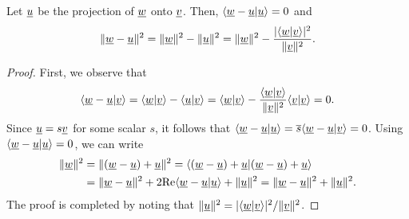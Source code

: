 \begin{lemma} \label{lem:proj_loss}
Let $\underline{u}$ be the projection of $\underline{w}$ onto $\underline{v}$.
Then, $\langle \underline{w}-\underline{u} | \underline{u} \rangle = 0$ and
\[ \|\underline{w}-\underline{u}\|^2 =  \|\underline{w}\|^2 - \| \underline{u} \|^2 = \|\underline{w}\|^2 - \frac{|\langle \underline{w} | \underline{v} \rangle|^2}{\|\underline{v}\|^2}. \]
\end{lemma}
\begin{proof}
First, we observe that
\[ \langle \underline{w} - \underline{u} | \underline{v} \rangle = \langle \underline{w} | \underline{v} \rangle - \langle \underline{u} | \underline{v} \rangle = \langle \underline{w} | \underline{v} \rangle - \frac{\left\langle \underline{w} | \underline{v} \right\rangle}{\|\underline{v}\|^2} \langle \underline{v} | \underline{v} \rangle = 0. \]
Since $\underline{u} = s \underline{v}$ for some scalar $s$, it follows that $\langle \underline{w}-\underline{u} | \underline{u} \rangle = \overline{s} \langle \underline{w}-\underline{u} | \underline{v} \rangle =  0$.
Using $\langle \underline{w}-\underline{u} | \underline{u} \rangle = 0$, we can write
\begin{align*}
\|\underline{w}\|^2 &= \|(\underline{w}-\underline{u})+\underline{u}\|^2
= \langle (\underline{w}-\underline{u})+\underline{u}|(\underline{w}-\underline{u})+\underline{u}\rangle \\
&= \|\underline{w}-\underline{u}\|^2 + 2 \mathrm{Re} \langle \underline{w}-\underline{u} | \underline{u} \rangle + \|\underline{u}\|^2
= \|\underline{w}-\underline{u}\|^2 + \|\underline{u}\|^2.
\end{align*}
The proof is completed by noting that $\|\underline{u}\|^2 = |\langle \underline{w} | \underline{v} \rangle|^2 / \|\underline{v}\|^2$.
\end{proof}

